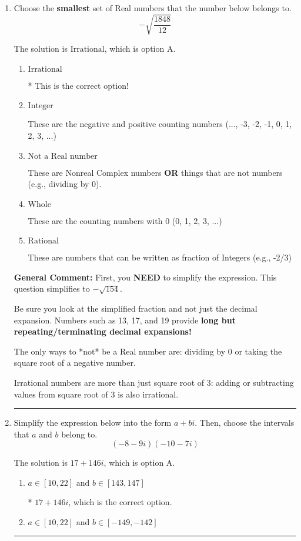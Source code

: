 \documentclass{extbook}[14pt]
\newcommand{\litem}[1]{\item #1

\rule{\textwidth}{0.4pt}}
\begin{document}
\begin{enumerate}\litem{
Choose the \textbf{smallest} set of Real numbers that the number below belongs to.
\[ -\sqrt{\frac{1848}{12}} \]

The solution is \( \text{Irrational} \), which is option A.\begin{enumerate}[label=\Alph*.]
\item \( \text{Irrational} \)

* This is the correct option!
\item \( \text{Integer} \)

These are the negative and positive counting numbers (..., -3, -2, -1, 0, 1, 2, 3, ...)
\item \( \text{Not a Real number} \)

These are Nonreal Complex numbers \textbf{OR} things that are not numbers (e.g., dividing by 0).
\item \( \text{Whole} \)

These are the counting numbers with 0 (0, 1, 2, 3, ...)
\item \( \text{Rational} \)

These are numbers that can be written as fraction of Integers (e.g., -2/3)
\end{enumerate}

\textbf{General Comment:} First, you \textbf{NEED} to simplify the expression. This question simplifies to $-\sqrt{154}$. 
 
 Be sure you look at the simplified fraction and not just the decimal expansion. Numbers such as 13, 17, and 19 provide \textbf{long but repeating/terminating decimal expansions!} 
 
 The only ways to *not* be a Real number are: dividing by 0 or taking the square root of a negative number. 
 
 Irrational numbers are more than just square root of 3: adding or subtracting values from square root of 3 is also irrational.
}
\litem{
Simplify the expression below into the form $a+bi$. Then, choose the intervals that $a$ and $b$ belong to.
\[ (-8 - 9 i)(-10 - 7 i) \]

The solution is \( 17 + 146 i \), which is option A.\begin{enumerate}[label=\Alph*.]
\item \( a \in [10, 22] \text{ and } b \in [143, 147] \)

* $17 + 146 i$, which is the correct option.
\item \( a \in [10, 22] \text{ and } b \in [-149, -142] \)


\end{enumerate}}
\end{enumerate}
\end{document}

